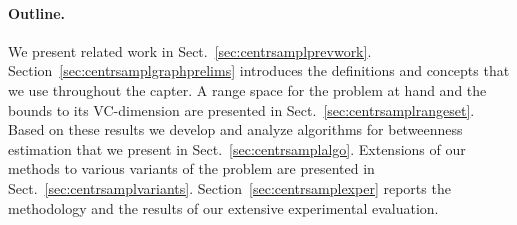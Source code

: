 \paragraph{Outline.} We present related work in
Sect.~\ref{sec:centrsamplprevwork}. Section~\ref{sec:centrsamplgraphprelims}
introduces the definitions and concepts that we use throughout the
capter. A range space for the problem at hand and the bounds to its VC-dimension
are presented in Sect.~\ref{sec:centrsamplrangeset}. Based on these results we develop and
analyze algorithms for betweenness estimation that we present in
Sect.~\ref{sec:centrsamplalgo}. %
\ifproof
Extensions of our methods to various variants of the problem are presented in
Sect.~\ref{sec:centrsamplvariants}. %
\fi 
Section~\ref{sec:centrsamplexper} reports the methodology and
the results of our extensive experimental evaluation.

